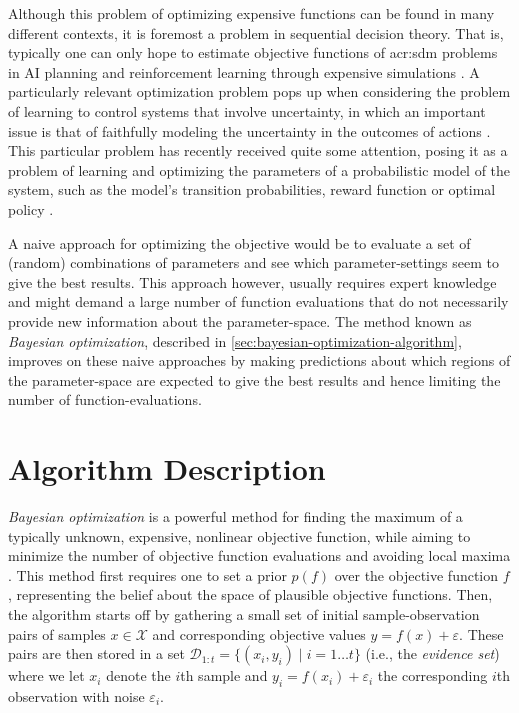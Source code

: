 Although this problem of optimizing expensive functions can be found in many different contexts, it is foremost a problem in sequential decision theory. 
That is, typically one can only hope to estimate objective functions of \acrshort{acr:sdm} problems in AI planning and reinforcement learning through expensive simulations \cite{Brochu2010}. 
A particularly relevant optimization problem pops up when considering the problem of learning to control systems that involve uncertainty, in which an important issue is that of faithfully modeling the uncertainty in the outcomes of actions \cite{Ghahramani2015}.
This particular problem has recently received quite some attention, posing it as a problem of learning and optimizing the parameters of a probabilistic model of the system, such as the model's transition probabilities, reward function or optimal policy \cite{Poupart2010}.

A naive approach for optimizing the objective would be to evaluate a set of (random) combinations of parameters and see which parameter-settings seem to give the best results.
This approach however, usually requires expert knowledge and might demand a large number of function evaluations that do not necessarily provide new information about the parameter-space.
The method known as \textit{Bayesian optimization}, described in \autoref{sec:bayesian-optimization-algorithm}, improves on these naive approaches by making predictions about which regions of the parameter-space are expected to give the best results and hence limiting the number of function-evaluations.

\section{Algorithm Description}
\label{sec:bayesian-optimization-algorithm}

\textit{Bayesian optimization} is a powerful method for finding the maximum of a typically unknown, expensive, nonlinear objective function, while aiming to minimize the number of objective function evaluations and avoiding local maxima \cite{Brochu2010}.
This method first requires one to set a prior $p(f)$ over the objective function $f$, representing the belief about the space of plausible objective functions.
Then, the algorithm starts off by gathering a small set of initial sample-observation pairs of samples $x \in \mathcal{X}$ and corresponding objective values $y = f(x) + \varepsilon$.
These pairs are then stored in a set $\mathcal{D}_{1:t} = \{(x_i, y_i) \mid i = 1 \ldots t\}$ (i.e., the \textit{evidence set}) where we let $x_i$ denote the $i$th sample and $y_i = f(x_i) + \varepsilon_i$ the corresponding $i$th observation with noise $\varepsilon_i$.

